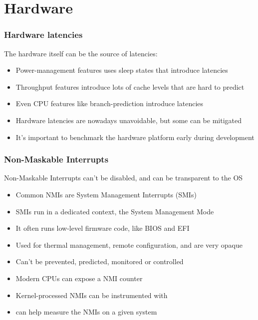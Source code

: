 \section{Hardware}

\begin{frame}
        \frametitle{Hardware latencies}
        The hardware itself can be the source of latencies:
        \begin{itemize}
                \item Power-management features uses sleep states that introduce latencies
                \item Throughput features introduce lots of cache levels that are hard to predict
                \item Even CPU features like branch-prediction introduce latencies
                \item Hardware latencies are nowadays unavoidable, but some can be mitigated
                \item It's important to benchmark the hardware platform early during development
        \end{itemize}
\end{frame}

\begin{frame}
        \frametitle{Non-Maskable Interrupts}
        Non-Maskable Interrupts can't be disabled, and can be transparent to the OS
        \begin{itemize}
                \item Common NMIs are System Management Interrupts (SMIs)
                \item SMIs run in a dedicated context, the System Management Mode
                \item It often runs low-level firmware code, like BIOS and EFI
                \item Used for thermal management, remote configuration, and are very opaque
                \item Can't be prevented, predicted, monitored or controlled
                \item Modern CPUs can expose a NMI counter
                \item Kernel-processed NMIs can be instrumented with 
                \item {} can help measure the NMIs on a given system
        \end{itemize}
\end{frame}

